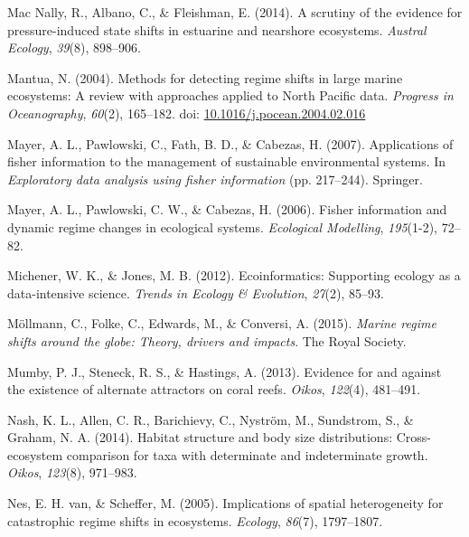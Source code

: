 \documentclass[12pt,twoside,openany]{reedthesis}
\begin{document}
\leavevmode\hypertarget{ref-mac2014scrutiny}{}%
Mac Nally, R., Albano, C., \& Fleishman, E. (2014). A scrutiny of the evidence for pressure-induced state shifts in estuarine and nearshore ecosystems. \emph{Austral Ecology}, \emph{39}(8), 898--906.

\leavevmode\hypertarget{ref-mantua_methods_2004}{}%
Mantua, N. (2004). Methods for detecting regime shifts in large marine ecosystems: A review with approaches applied to North Pacific data. \emph{Progress in Oceanography}, \emph{60}(2), 165--182. doi: \href{https://doi.org/10.1016/j.pocean.2004.02.016}{10.1016/j.pocean.2004.02.016}

\leavevmode\hypertarget{ref-mayer_applications_2007}{}%
Mayer, A. L., Pawlowski, C., Fath, B. D., \& Cabezas, H. (2007). Applications of fisher information to the management of sustainable environmental systems. In \emph{Exploratory data analysis using fisher information} (pp. 217--244). Springer.

\leavevmode\hypertarget{ref-mayer_fisher_2006}{}%
Mayer, A. L., Pawlowski, C. W., \& Cabezas, H. (2006). Fisher information and dynamic regime changes in ecological systems. \emph{Ecological Modelling}, \emph{195}(1-2), 72--82.

\leavevmode\hypertarget{ref-michener2012ecoinformatics}{}%
Michener, W. K., \& Jones, M. B. (2012). Ecoinformatics: Supporting ecology as a data-intensive science. \emph{Trends in Ecology \& Evolution}, \emph{27}(2), 85--93.

\leavevmode\hypertarget{ref-mollmann2015marine}{}%
Möllmann, C., Folke, C., Edwards, M., \& Conversi, A. (2015). \emph{Marine regime shifts around the globe: Theory, drivers and impacts}. The Royal Society.

\leavevmode\hypertarget{ref-mumby2013evidence}{}%
Mumby, P. J., Steneck, R. S., \& Hastings, A. (2013). Evidence for and against the existence of alternate attractors on coral reefs. \emph{Oikos}, \emph{122}(4), 481--491.

\leavevmode\hypertarget{ref-nash2014habitat}{}%
Nash, K. L., Allen, C. R., Barichievy, C., Nyström, M., Sundstrom, S., \& Graham, N. A. (2014). Habitat structure and body size distributions: Cross-ecosystem comparison for taxa with determinate and indeterminate growth. \emph{Oikos}, \emph{123}(8), 971--983.

\leavevmode\hypertarget{ref-van2005implications}{}%
Nes, E. H. van, \& Scheffer, M. (2005). Implications of spatial heterogeneity for catastrophic regime shifts in ecosystems. \emph{Ecology}, \emph{86}(7), 1797--1807.
\end{document}
